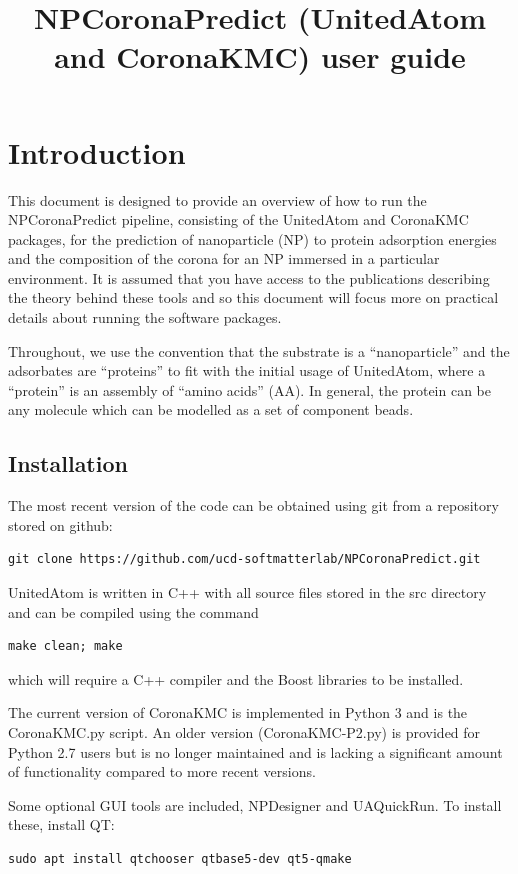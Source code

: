 \documentclass[10pt,a4paper,onecolumn]{report}
\begin{document}
\title{NPCoronaPredict (UnitedAtom and CoronaKMC) user guide}

\maketitle 

\chapter{Introduction}
This document is designed to provide an overview of how to run the NPCoronaPredict pipeline, consisting of the UnitedAtom and CoronaKMC packages, for the prediction of nanoparticle (NP) to protein adsorption energies and the composition of the corona for an NP immersed in a particular environment. It is assumed that you have access to the publications describing the theory behind these tools and so this document will focus more on practical details about running the software packages.

Throughout, we use the convention that the substrate is a ``nanoparticle'' and the adsorbates are ``proteins'' to fit with the initial usage of UnitedAtom, where a ``protein'' is an assembly of ``amino acids'' (AA). In general, the protein can be any molecule which can be modelled as a set of component beads.

\section{Installation}
The most recent version of the code can be obtained using git from a repository stored on github:
\begin{lstlisting}
git clone https://github.com/ucd-softmatterlab/NPCoronaPredict.git
\end{lstlisting}

UnitedAtom is written in C++ with all source files stored in the src directory and can be compiled using the command
\begin{lstlisting}
make clean; make
\end{lstlisting}
which will require a C++ compiler and the Boost libraries to be installed.

The current version of CoronaKMC is implemented in Python 3 and is the CoronaKMC.py script. An older version (CoronaKMC-P2.py) is provided for Python 2.7 users but is no longer maintained and is lacking a significant amount of functionality compared to more recent versions. 
 
Some optional GUI tools are included, NPDesigner and UAQuickRun. To install these, install QT:
\begin{lstlisting}
sudo apt install qtchooser qtbase5-dev qt5-qmake 
\end{lstlisting} 
\end{document}
